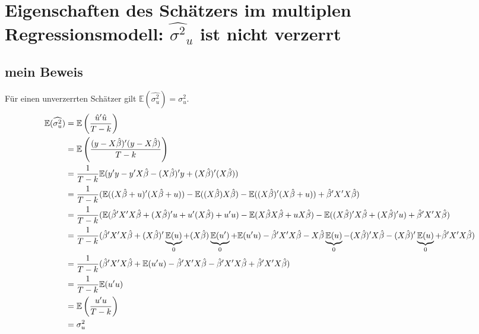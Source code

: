 \documentclass{article}
\newcommand{\E}{\mathbb{E}}
\begin{document}
	\section{Eigenschaften des Schätzers im multiplen Regressionsmodell: $\widehat{\sigma^2}_u$ ist nicht verzerrt}
	\subsection{mein Beweis}
	Für einen unverzerrten Schätzer gilt $\E(\widehat{\sigma_u^2}) = \sigma_u^2$.
	\begin{align}
		\E(\widehat{\sigma_u^2}) &= \E\left( \frac{\hat{u}'\hat{u}}{T-k}\right) \notag \\
		&= \E\left( \frac{(y-X\hat{\beta})'(y-X\hat{\beta})}{T-k}\right) \notag \\
		&= \frac{1}{T-k}\E(y'y - y'X\hat{\beta} - (X\hat{\beta})'y + (X\hat{\beta})'(X\hat{\beta})) \notag \\
		&= \frac{1}{T-k} (\E((X\hat{\beta}+u)'(X\hat{\beta}+u)) - \E((X\hat{\beta})X\hat{\beta}) - \E((X\hat{\beta})'(X\hat{\beta}+u)) + \hat{\beta}'X'X\hat{\beta}) \notag \\
		&= \frac{1}{T-k} (\E(\hat{\beta}'X'X\hat{\beta} + (X\hat{\beta})'u + u'(X\hat{\beta}) + u'u) - \E(X\hat{\beta}X\hat{\beta} + uX\hat{\beta}) - \E((X\hat{\beta})'X\hat{\beta} + (X\hat{\beta})'u) + \hat{\beta}'X'X\hat{\beta}) \notag \\
		&= \frac{1}{T-k} (\hat{\beta}'X'X\hat{\beta} + (X\hat{\beta})'\underbrace{\E(u)}_{0} + (X\hat{\beta})\underbrace{\E(u')}_{0} + \E(u'u) - \hat{\beta}'X'X\hat{\beta} - X\hat{\beta}\underbrace{\E(u)}_{0} - (X\hat{\beta})'X\hat{\beta} - (X\hat{\beta})'\underbrace{\E(u)}_{0} + \hat{\beta}'X'X\hat{\beta}) \notag \notag \\
		&= \frac{1}{T-k} (\hat{\beta}'X'X\hat{\beta} + \E(u'u) - \hat{\beta}'X'X\hat{\beta} - \hat{\beta}'X'X\hat{\beta} + \hat{\beta}'X'X\hat{\beta}) \notag \\
		&= \frac{1}{T-k} \E(u'u) \notag \\
		&= \E\left( \frac{u'u}{T-k}\right) \notag \\
		&= \sigma_u^2 \notag
	\end{align}
\end{document}
